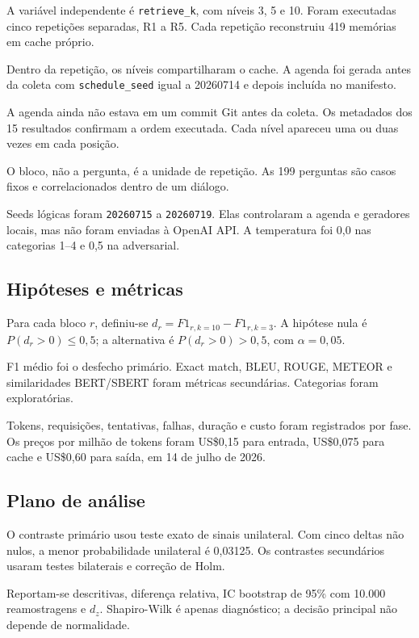 \documentclass[sigconf]{acmart}
\begin{document}
A variável independente é \texttt{retrieve\_k}, com níveis 3, 5 e 10. Foram executadas cinco repetições separadas, R1 a R5. Cada repetição reconstruiu 419 memórias em cache próprio.

Dentro da repetição, os níveis compartilharam o cache. A agenda foi gerada antes da coleta com \texttt{schedule\_seed} igual a 20260714 e depois incluída no manifesto.

A agenda ainda não estava em um commit Git antes da coleta. Os metadados dos 15 resultados confirmam a ordem executada. Cada nível apareceu uma ou duas vezes em cada posição.

O bloco, não a pergunta, é a unidade de repetição. As 199 perguntas são casos fixos e correlacionados dentro de um diálogo.

Seeds lógicas foram \texttt{20260715} a \texttt{20260719}. Elas controlaram a agenda e geradores locais, mas não foram enviadas à OpenAI API. A temperatura foi 0,0 nas categorias 1--4 e 0,5 na adversarial.

\subsection{Hipóteses e métricas}

Para cada bloco \(r\), definiu-se \(d_r=F1_{r,k=10}-F1_{r,k=3}\). A hipótese nula é \(P(d_r>0)\leq0,5\); a alternativa é \(P(d_r>0)>0,5\), com \(\alpha=0,05\).

F1 médio foi o desfecho primário. Exact match, BLEU, ROUGE, METEOR e similaridades BERT/SBERT foram métricas secundárias. Categorias foram exploratórias.

Tokens, requisições, tentativas, falhas, duração e custo foram registrados por fase. Os preços por milhão de tokens foram US\$0,15 para entrada, US\$0,075 para cache e US\$0,60 para saída, em 14 de julho de 2026.

\subsection{Plano de análise}

O contraste primário usou teste exato de sinais unilateral. Com cinco deltas não nulos, a menor probabilidade unilateral é 0,03125. Os contrastes secundários usaram testes bilaterais e correção de Holm.

Reportam-se descritivas, diferença relativa, IC bootstrap de 95\% com 10.000 reamostragens e \(d_z\). Shapiro-Wilk é apenas diagnóstico; a decisão principal não depende de normalidade.
\end{document}
